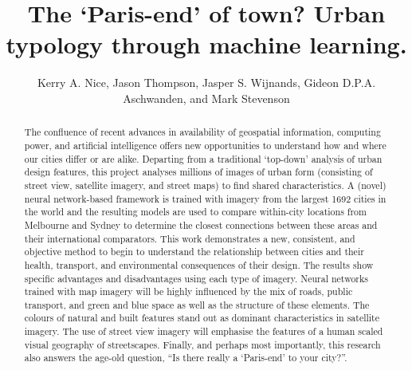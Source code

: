 \documentclass[Crown,sageh,times]{sagej}
\begin{document}
\title{The `Paris-end' of town? Urban typology through machine learning.}

\author{Kerry A. Nice, Jason Thompson, Jasper S. Wijnands, Gideon D.P.A. Aschwanden, and Mark Stevenson}





\begin{abstract}

The confluence of recent advances in availability of geospatial information, computing power, and artificial intelligence offers new opportunities to understand how and where our cities differ or are alike. Departing from a traditional `top-down' analysis of urban design features, this project analyses millions of images of urban form (consisting of street view, satellite imagery, and street maps) to find shared characteristics. A (novel) neural network-based framework is trained with imagery from the largest 1692 cities in the world and the resulting models are used to compare within-city locations from Melbourne and Sydney to determine the closest connections between these areas and their international comparators. This work demonstrates a new, consistent, and objective method to begin to understand the relationship between cities and their health, transport, and environmental consequences of their design. The results show specific advantages and disadvantages using each type of imagery. Neural networks trained with map imagery will be highly influenced by the mix of roads, public transport, and green and blue space as well as the structure of these elements. The colours of natural and built features stand out as dominant characteristics in satellite imagery. The use of street view imagery will emphasise the features of a human scaled visual geography of streetscapes. Finally, and perhaps most importantly, this research also answers the age-old question, ``Is there really a `Paris-end' to your city?''.
\end{abstract}
\end{document}
